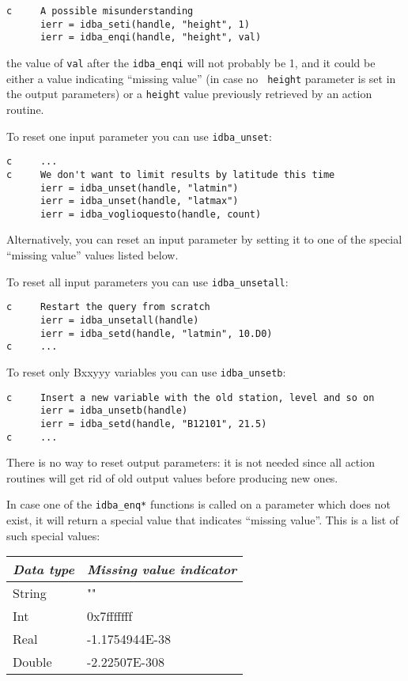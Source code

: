 \documentclass[final,12pt,a4paper,twoside]{book}
\begin{document}
\begin{verbatim}
c     A possible misunderstanding
      ierr = idba_seti(handle, "height", 1)
      ierr = idba_enqi(handle, "height", val)
\end{verbatim}

the value of {\tt val} after the {\tt idba\_enqi} will not probably be 1, and
it could be either a value indicating ``missing value'' (in case no {\tt
height} parameter is set in the output parameters) or a {\tt height} value
previously retrieved by an action routine.

To reset one input parameter you can use {\tt idba\_unset}:
\label{fun-idba_unset}

\begin{verbatim}
c     ...
c     We don't want to limit results by latitude this time
      ierr = idba_unset(handle, "latmin")
      ierr = idba_unset(handle, "latmax")
      ierr = idba_voglioquesto(handle, count)
\end{verbatim}

Alternatively, you can reset an input parameter by setting it to one of the
special ``missing value'' values listed below.

To reset all input parameters you can use {\tt idba\_unsetall}:
\label{fun-idba_unsetall}

\begin{verbatim}
c     Restart the query from scratch
      ierr = idba_unsetall(handle)
      ierr = idba_setd(handle, "latmin", 10.D0)
c     ...
\end{verbatim}

To reset only Bxxyyy variables you can use {\tt idba\_unsetb}:
\label{fun-idba_unsetall}

\begin{verbatim}
c     Insert a new variable with the old station, level and so on
      ierr = idba_unsetb(handle)
      ierr = idba_setd(handle, "B12101", 21.5)
c     ...
\end{verbatim}

There is no way to reset output parameters: it is not needed since all action
routines will get rid of old output values before producing new ones.

In case one of the {\tt idba\_enq*} functions is called on a parameter which
does not exist, it will return a special value that indicates ``missing
value''.  This is a list of such special values:

\begin{tabular}{|l|l|}
\hline
{\em Data type} & {\em Missing value indicator}               \\
\hline
String  &  ""			\\
Int     & 0x7fffffff		\\
Real    & -1.1754944E-38	\\
Double  & -2.22507E-308		\\
\hline
\end{tabular}
\end{document}
